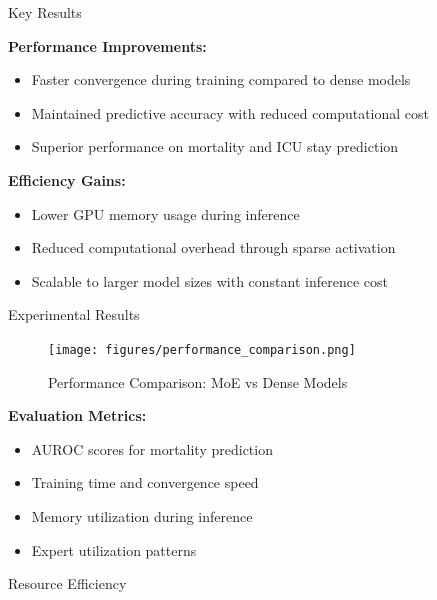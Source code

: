 \documentclass[final]{beamer}
\newlength{\sepwidth}
\newlength{\colwidth}
\newcommand{\separatorcolumn}{\begin{column}{\sepwidth}\end{column}}
\begin{document}
\begin{frame}[t]
\begin{columns}[t]
\separatorcolumn

\begin{column}{\colwidth}

  \begin{alertblock}{Key Results}
    
    \textbf{Performance Improvements:}
    \begin{itemize}
        \item Faster convergence during training compared to dense models
        \item Maintained predictive accuracy with reduced computational cost
        \item Superior performance on mortality and ICU stay prediction
    \end{itemize}

    \textbf{Efficiency Gains:}
    \begin{itemize}
        \item Lower GPU memory usage during inference
        \item Reduced computational overhead through sparse activation
        \item Scalable to larger model sizes with constant inference cost
    \end{itemize}
    
  \end{alertblock}

  \begin{block}{Experimental Results}
    
    \begin{figure}
        \centering
        \texttt{[image: figures/performance\_comparison.png]}
        \caption{Performance Comparison: MoE vs Dense Models}
        \label{fig:performance}
    \end{figure}

    \textbf{Evaluation Metrics:}
    \begin{itemize}
        \item AUROC scores for mortality prediction
        \item Training time and convergence speed
        \item Memory utilization during inference
        \item Expert utilization patterns
    \end{itemize}
    
  \end{block}

  \begin{block}{Resource Efficiency}
    

\end{block}
\end{column}
\end{columns}
\end{frame}
\end{document}
